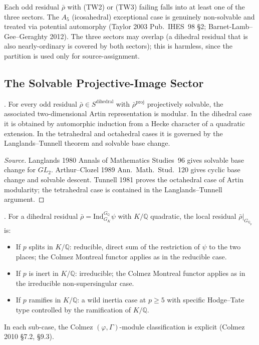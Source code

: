 \begin{remark}
\label{v4-arith:w6-e:rem:non-TW-extent}
Each odd residual \(\bar\rho\) with (TW2) or (TW3) failing falls into
at least one of the three sectors. The \(A_{5}\) (icosahedral)
exceptional case is genuinely non-solvable and treated via potential
automorphy (Taylor 2003 Pub.~IHES~98 \S 2; Barnet-Lamb--Gee--Geraghty
2012). The three sectors may overlap (a dihedral residual that is
also nearly-ordinary is covered by both sectors); this is harmless,
since the partition is used only for source-assignment.
\end{remark}

\subsection{The Solvable Projective-Image Sector}

\begin{lemma}
\label{v4-arith:w6-e:lem:AC-dihedral}
\ClaimStatusProvedElsewhere. For every odd residual
\(\bar\rho\in S^{\mathrm{dihedral}}\) with \(\bar\rho^{\mathrm{proj}}\)
projectively solvable, the associated two-dimensional Artin
representation is modular. In the dihedral case it is obtained by
automorphic induction from a Hecke character of a quadratic extension.
In the tetrahedral and octahedral cases it is governed by the
Langlands--Tunnell theorem and solvable base change.
\end{lemma}

\begin{proof}[Source]
Langlands 1980 Annals of Mathematics Studies~96 gives solvable base
change for \(GL_{2}\). Arthur--Clozel 1989 Ann.~Math.~Stud.~120 gives
cyclic base change and solvable descent. Tunnell 1981 proves the
octahedral case of Artin modularity; the tetrahedral case is contained
in the Langlands--Tunnell argument.
\end{proof}

\begin{lemma}[Colmez--Pa{\v s}k{\=u}nas on induced local residuals]
\label{v4-arith:w6-e:lem:CP-induced}
\ClaimStatusProvedElsewhere. For a dihedral residual
\(\bar\rho=\mathrm{Ind}^{G_{\mathbb{Q}}}_{G_{K}}\psi\) with
\(K/\mathbb{Q}\) quadratic, the local residual
\(\bar\rho|_{G_{\mathbb{Q}_{p}}}\) is:
\begin{itemize}
\item If \(p\) splits in \(K/\mathbb{Q}\): reducible, direct sum of the
restriction of \(\psi\) to the two places; the Colmez Montreal functor
applies as in the reducible case.
\item If \(p\) is inert in \(K/\mathbb{Q}\): irreducible; the Colmez
Montreal functor applies as in the irreducible non-supersingular case.
\item If \(p\) ramifies in \(K/\mathbb{Q}\): a wild inertia case at
\(p\geq 5\) with specific Hodge--Tate type controlled by the
ramification of \(K/\mathbb{Q}\).
\end{itemize}
In each sub-case, the Colmez \((\varphi,\Gamma)\)-module classification
is explicit (Colmez 2010 \S 7.2, \S 9.3).
\end{lemma}


